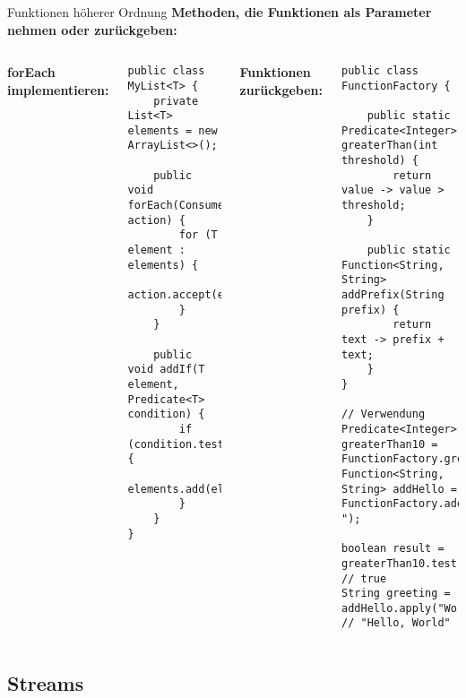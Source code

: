\begin{frame}[fragile]{Funktionen höherer Ordnung}
  \textbf{Methoden, die Funktionen als Parameter nehmen oder zurückgeben:}

  \begin{columns}[T]
    \textbf{forEach implementieren:}
    \begin{lstlisting}[style=java, basicstyle=\tiny\ttfamily]
public class MyList<T> {
    private List<T> elements = new ArrayList<>();

    public void forEach(Consumer<T> action) {
        for (T element : elements) {
            action.accept(element);
        }
    }

    public void addIf(T element, Predicate<T> condition) {
        if (condition.test(element)) {
            elements.add(element);
        }
    }
}
    \end{lstlisting}

    \textbf{Funktionen zurückgeben:}
    \begin{lstlisting}[style=java, basicstyle=\tiny\ttfamily]
public class FunctionFactory {

    public static Predicate<Integer> greaterThan(int threshold) {
        return value -> value > threshold;
    }

    public static Function<String, String> addPrefix(String prefix) {
        return text -> prefix + text;
    }
}

// Verwendung
Predicate<Integer> greaterThan10 = FunctionFactory.greaterThan(10);
Function<String, String> addHello = FunctionFactory.addPrefix("Hello, ");

boolean result = greaterThan10.test(15); // true
String greeting = addHello.apply("World"); // "Hello, World"
    \end{lstlisting}
  \end{columns}
\end{frame}


\subsection{Streams}

